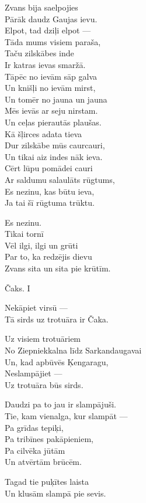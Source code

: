 \documentclass[14pt]{extarticle}
\begin{document}
Zvans bija saelpojies\\
Pārāk daudz Gaujas ievu.\\
Elpot, tad dziļi elpot ---\\
Tāda mums visiem paraša,\\
Taču zilskābes inde\\
Ir katras ievas smaržā.\\
Tāpēc no ievām sāp galva\\
Un knišļi no ievām mirst,\\
Un tomēr no jauna un jauna\\
Mēs ievās ar seju nirstam.\\
Un ceļas pierautās plaušas.\\
Kā šļirces adata tieva\\
Dur zilskābe mūs caurcauri,\\
Un tikai aiz indes nāk ieva.\\
Cērt lūpu pomādei cauri\\
Ar saldumu salaulāts rūgtums,\\
Es nezinu, kas būtu ieva,\\
Ja tai šī rūgtuma trūktu.

Es nezinu.\\
Tikai tornī\\
Vēl ilgi, ilgi un grūti\\
Par to, ka redzējis dievu\\
Zvans sita un sita pie krūtīm.


\newpage

{\large \sc Čaks. I}

Nekāpiet virsū ---\\
Tā sirds uz trotuāra ir Čaka.

Uz visiem trotuāriem\\
No Ziepniekkalna līdz Sarkandaugavai\\
Un, kad apbūvēs Ķengaragu,\\
Neslampājiet ---\\
Uz trotuāra būs sirds.

Daudzi pa to jau ir slampājuši.\\
Tie, kam vienalga, kur slampāt ---\\
Pa grīdas tepiķi,\\
Pa tribīnes pakāpieniem,\\
Pa cilvēka jūtām\\
Un atvērtām brūcēm.

Tagad tie puķītes laista\\
Un klusām slampā pie sevis.
\end{document}
